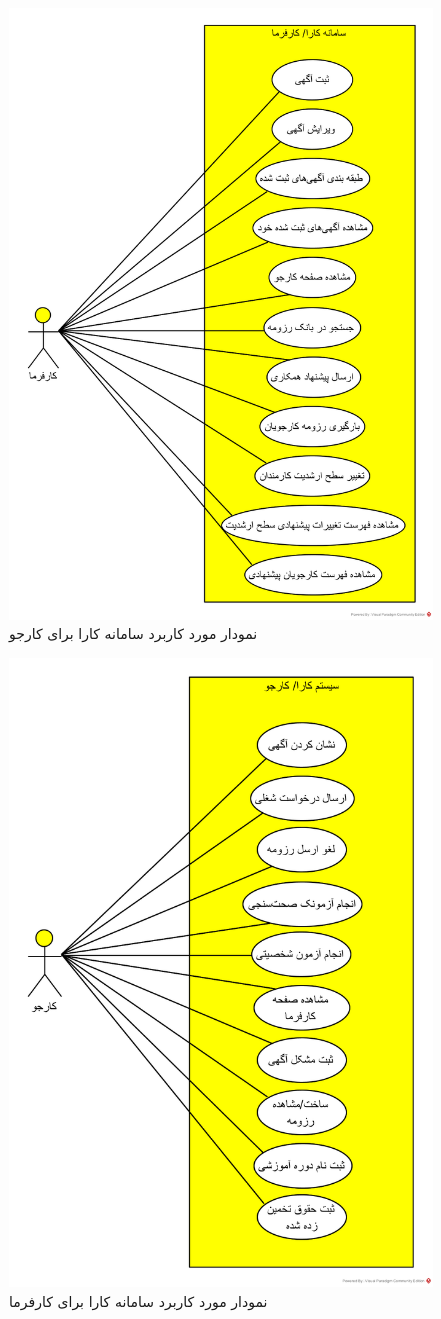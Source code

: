 \documentclass[12pt]{article}
\begin{document}
	\begin{figure}[H]
		\centering
		\includegraphics[width=0.7\linewidth]{files/UseCaseDiagram/UseCase_Applicant}
		\caption{نمودار مورد کاربرد سامانه کارا برای کارجو}
		\label{fig:usecaseapplicant}
	\end{figure}
	\begin{figure}[H]
		\centering
		\includegraphics[width=0.7\linewidth]{files/UseCaseDiagram/UseCase_Employer}
		\caption{نمودار مورد کاربرد سامانه کارا برای کارفرما}
		\label{fig:usecaseemployer}
	\end{figure}
\end{document}
